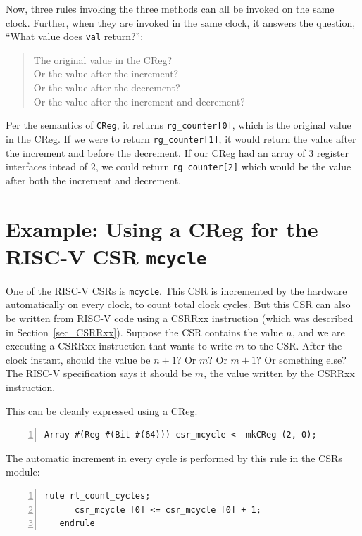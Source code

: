 Now, three rules invoking the three methods can all be invoked on the
same clock.  Further, when they are invoked in the same clock, it
answers the question, ``What value does \verb|val| return?'':

\begin{quote}
The original value in the CReg? \\
Or the value after the increment? \\
Or the value after the decrement? \\
Or the value after the increment and decrement?
\end{quote}

Per the semantics of \verb|CReg|, it returns \verb|rg_counter[0]|,
which is the original value in the CReg.  If we were to return
\verb|rg_counter[1]|, it would return the value after the increment
and before the decrement.  If our CReg had an array of 3 register
interfaces intead of 2, we could return \verb|rg_counter[2]| which
would be the value after both the increment and decrement.


\section{Example: Using a CReg for the RISC-V CSR {\tt mcycle}}

\label{Sec_CSR_mcycle}

One of the RISC-V CSRs is {\tt mcycle}.  This CSR is incremented by
the hardware automatically on every clock, to count total clock
cycles.  But this CSR can also be written from RISC-V code using a
CSRRxx instruction (which was described in Section~\ref{sec_CSRRxx}).
Suppose the CSR contains the value $n$, and we are executing a CSRRxx
instruction that wants to write $m$ to the CSR.  After the clock
instant, should the value be $n+1$? Or $m$? Or $m+1$? Or something
else?  The RISC-V specification says it should be $m$, the value
written by the CSRRxx instruction.

This can be cleanly expressed using a CReg.

{\footnotesize
\begin{Verbatim}[frame=single, numbers=left, label=from src\_Common/CSRs.bsv]
   Array #(Reg #(Bit #(64))) csr_mcycle <- mkCReg (2, 0);
\end{Verbatim}
}

The automatic increment in every cycle is performed by this rule in
the CSRs module:
{\footnotesize
\begin{Verbatim}[frame=single, numbers=left, label=from src\_Common/CSRs.bsv]
   rule rl_count_cycles;
      csr_mcycle [0] <= csr_mcycle [0] + 1;
   endrule
\end{Verbatim}
}

